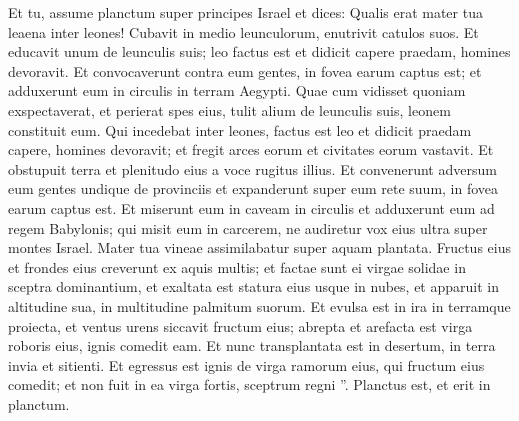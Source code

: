 \begin{biblechapter}
\begin{biblechapter}
\begin{biblechapter}
\begin{biblechapter}
\begin{biblechapter}
\begin{biblechapter}
\begin{biblechapter}
\begin{biblechapter}
\begin{biblechapter}
\begin{biblechapter}
\begin{biblechapter}
\begin{biblechapter}
\begin{biblechapter}
\begin{biblechapter}
\begin{biblechapter}
\begin{biblechapter}
\begin{biblechapter}
\begin{biblechapter}
\begin{biblechapter}
\verse Et tu, assume planctum super principes Israel 
\verse et dices:
 Qualis erat mater tua leaena
 inter leones!
 Cubavit in medio leunculorum,
 enutrivit catulos suos.
 \verse Et educavit unum de leunculis suis;
 leo factus est
 et didicit capere praedam,
 homines devoravit.
 \verse Et convocaverunt contra eum gentes,
 in fovea earum captus est;
 et adduxerunt eum in circulis
 in terram Aegypti.
 \verse Quae cum vidisset quoniam exspectaverat,
 et perierat spes eius,
 tulit alium de leunculis suis,
 leonem constituit eum.
 \verse Qui incedebat inter leones,
 factus est leo
 et didicit praedam capere,
 homines devoravit;
 \verse et fregit arces eorum
 et civitates eorum vastavit.
 Et obstupuit terra et plenitudo eius
 a voce rugitus illius.
 \verse Et convenerunt adversum eum gentes
 undique de provinciis
 et expanderunt super eum rete suum,
 in fovea earum captus est.
 \verse Et miserunt eum in caveam in circulis
 et adduxerunt eum ad regem Babylonis;
 qui misit eum in carcerem,
 ne audiretur vox eius ultra
 super montes Israel.
 \verse Mater tua vineae assimilabatur
 super aquam plantata.
 Fructus eius et frondes eius creverunt
 ex aquis multis;
 \verse et factae sunt ei virgae solidae
 in sceptra dominantium,
 et exaltata est statura eius
 usque in nubes,
 et apparuit in altitudine sua,
 in multitudine palmitum suorum.
 \verse Et evulsa est in ira
 in terramque proiecta,
 et ventus urens siccavit fructum eius;
 abrepta et arefacta est virga roboris eius,
 ignis comedit eam.
 \verse Et nunc transplantata est in desertum,
 in terra invia et sitienti.
 \verse Et egressus est ignis de virga ramorum eius,
 qui fructum eius comedit;
 et non fuit in ea virga fortis,
 sceptrum regni ”.
 Planctus est, et erit in planctum.
 

\end{biblechapter}
\end{biblechapter}
\end{biblechapter}
\end{biblechapter}
\end{biblechapter}
\end{biblechapter}
\end{biblechapter}
\end{biblechapter}
\end{biblechapter}
\end{biblechapter}
\end{biblechapter}
\end{biblechapter}
\end{biblechapter}
\end{biblechapter}
\end{biblechapter}
\end{biblechapter}
\end{biblechapter}
\end{biblechapter}
\end{biblechapter}
